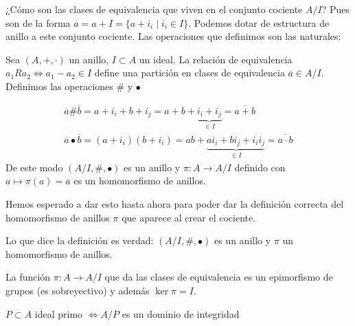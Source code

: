 ¿Cómo son las clases de equivalencia que viven en el conjunto cociente $A/I$? Pues son de la forma $\overline{a} = a + I = \{a + i_i \mid i_i \in I\}$. Podemos dotar de estructura de anillo a este conjunto cociente. Las operaciones que definimos son las naturales:

\begin{dfn}
	Sea $(A, +, \cdot)$ un anillo, $I \subset A$ un ideal. La relación de equivalencia $a_1 R a_2 \iff a_1 - a_2 \in I$ define una partición en clases de equivalencia $\overline{a} \in A/I$. Definimos las operaciones $\#$ y $\bullet$
	
	\begin{align}
	\overline{a} \# \overline{b} = a + i_i + b + i_j = a+b + \underbrace{i_i + i_j}_{\in I} = \overline{a+b} \\
	\overline{a}\bullet\overline{b} = (a+i_i)(b+i_i) = ab + \underbrace{a i_i + b i_j + i_i i_j}_{\in I} = \overline{a \cdot b}
	\end{align}
	De este modo $(A/I, \#, \bullet)$ es un anillo y $\pi: A \to A/I$ definido con $a \mapsto \pi(a) = \overline{a}$ es un homomorfismo de anillos.
\end{dfn}

Hemos esperado a dar esto hasta ahora para poder dar la definición correcta del homomorfismo de anillos $\pi$ que aparece al crear el cociente.

\begin{pro}
	Lo que dice la definición es verdad: $(A/I, \#, \bullet)$ es un anillo y $\pi$ un homomorfismo de anillos.
\end{pro}

\begin{pro}
	La función $\pi: A \to A/I$ que da las clases de equivalencia es un epimorfismo de grupos (es sobreyectivo) y además $\ker \pi = I$.
\end{pro}

\begin{pro}
	$P \subset A$ ideal primo $\iff A/P$ es un dominio de integridad
\end{pro}

\begin{figure}[h]
	\centering
\end{figure}

